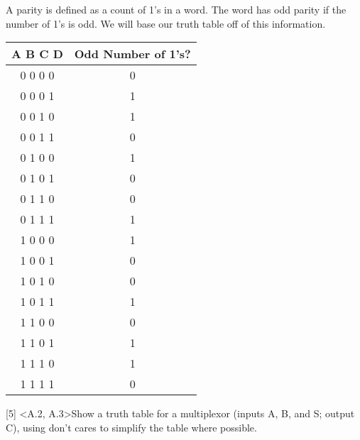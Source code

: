 \documentclass[12pt]{article}
\begin{document}
	\begin{center}
		A parity is defined as a count of 1's in a word. The word has odd parity if the number of 1's is odd. We will base our truth table off of this information. \vspace{0.5cm} \\
		
		\begin{tabular}{ |c|c| }
			\hline
			A B C D & Odd Number of 1's? \\
			\hline
			0 0 0 0 & 0 \\
			\hline
			0 0 0 1 & 1 \\
			\hline
			0 0 1 0 & 1 \\
			\hline
			0 0 1 1 & 0 \\
			\hline
			0 1 0 0 & 1 \\
			\hline
			0 1 0 1 & 0 \\
			\hline
			0 1 1 0 & 0 \\
			\hline
			0 1 1 1 & 1 \\
			\hline
			1 0 0 0 & 1 \\
			\hline
			1 0 0 1 & 0 \\
			\hline
			1 0 1 0 & 0 \\
			\hline
			1 0 1 1 & 1 \\
			\hline
			1 1 0 0 & 0 \\
			\hline
			1 1 0 1 & 1 \\
			\hline
			1 1 1 0 & 1 \\
			\hline
			1 1 1 1 & 0 \\
			\hline

		\end{tabular}
		
	\end{center}
	
	
	
	
	\newpage
	
	

	\noindent {} 
	[5] \textless A.2, A.3\textgreater Show a truth table for a multiplexor (inputs A, B, and S; output C), using don't cares to simplify the table where possible. \vspace{0.15cm} \\
	
\end{document}
